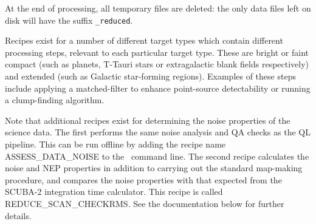 At the end of processing, all temporary files are deleted: the only
data files left on disk will have the suffix \verb+_reduced+.

Recipes exist for a number of different target types which contain
different processing steps, relevant to each particular target
type. These are bright or faint compact (such as planets, T-Tauri
stars or extragalactic blank fields respectively) and extended (such
as Galactic star-forming regions). Examples of these steps include
applying a matched-filter to enhance point-source detectability or
running a clump-finding algorithm.

Note that additional recipes exist for determining the noise
properties of the science data. The first performs the same noise
analysis and QA checks as the QL pipeline. This can be run offline by
adding the recipe name ASSESS\_DATA\_NOISE to the \oracdr\ command
line. The second recipe calculates the noise and NEP properties in
addition to carrying out the standard map-making procedure, and
compares the noise properties with that expected from the SCUBA-2
integration time calculator. This recipe is called
REDUCE\_SCAN\_CHECKRMS. See the documentation below for further
details.
